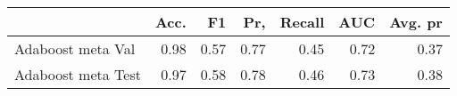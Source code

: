 \begin{tabular}{lrrrrrr}
\toprule
{} &  Acc. &    F1 &   Pr, &  Recall &   AUC &  Avg. pr \\
\midrule
Adaboost meta Val  &  0.98 &  0.57 &  0.77 &    0.45 &  0.72 &     0.37 \\
Adaboost meta Test &  0.97 &  0.58 &  0.78 &    0.46 &  0.73 &     0.38 \\
\bottomrule
\end{tabular}
